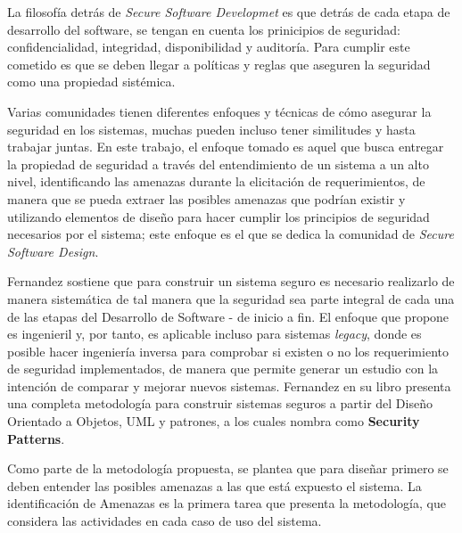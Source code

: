 La filosofía detrás de \textit{Secure Software Developmet} es que detrás de cada etapa de desarrollo del software, se tengan en cuenta los prinicipios de seguridad: confidencialidad, integridad, disponibilidad y auditoría. Para cumplir este cometido es que se deben llegar a políticas y reglas que aseguren la seguridad como una propiedad sistémica.

Varias comunidades tienen diferentes enfoques y técnicas de cómo asegurar la seguridad en los sistemas, muchas pueden incluso tener similitudes y hasta trabajar juntas. En este trabajo, el enfoque tomado es aquel que busca entregar la propiedad de seguridad a través del entendimiento de un sistema a un alto nivel, identificando las amenazas durante la elicitación de requerimientos, de manera que se pueda extraer las posibles amenazas que podrían existir y utilizando elementos de diseño para hacer cumplir los principios de seguridad necesarios por el sistema; este enfoque es el que se dedica la comunidad de \textit{Secure Software Design}. 

Fernandez \cite{Fernandez2011a,fernandez2013security} sostiene que para construir un sistema seguro es necesario realizarlo de manera sistemática de tal manera que la seguridad sea parte integral de cada una de las etapas del Desarrollo de Software - de inicio a fin. El enfoque que propone es ingenieril y, por tanto, es aplicable incluso para sistemas \textit{legacy}, donde es posible hacer ingeniería inversa para comprobar si existen o no los requerimiento de seguridad implementados, de manera que permite generar un estudio con la intención de comparar y mejorar nuevos sistemas. Fernandez en su libro \cite{fernandez2013security} presenta una completa metodología para construir sistemas seguros a partir del Diseño Orientado a Objetos, UML y patrones, a los cuales nombra como \textbf{Security Patterns}.

Como parte de la metodología propuesta, se plantea que para diseñar primero se deben entender las posibles amenazas a las que está expuesto el sistema. La identificación de Amenazas \cite{braz2008eliciting,fernandez2006defining} es la primera tarea que presenta la metodología, que considera las actividades en cada caso de uso del sistema.


